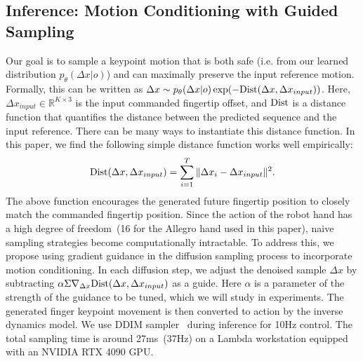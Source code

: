 \subsection{Inference: Motion Conditioning with Guided Sampling}
\label{method:inference}
Our goal is to sample a keypoint motion that is both safe (i.e. from our learned distribution $p_\theta(\Delta x|o)$) and can maximally preserve the input reference motion. Formally, this can be written as $\Delta{x}\sim p_\theta(\Delta x|o) \exp (-{\rm Dist}(\Delta x, \Delta x_{input}))$. Here, $\Delta x_{input}\in\mathbb{R}^{K\times 3}$ is the input commanded fingertip offset, and ${\rm Dist}$ is a distance function that quantifies the distance between the predicted sequence and the input reference. There can be many ways to instantiate this distance function. In this paper, we find the following simple distance function works well empirically: 
\begin{equation}
    {\rm Dist}(\Delta{x}, \Delta x_{input}) = \sum_{i=1}^T\Vert \Delta{x}_{i} - \Delta x_{input}  \Vert^2.
\end{equation}
The above function encourages the generated future fingertip position to closely match the commanded fingertip position. Since the action of the robot hand has a high degree of freedom~(16 for the Allegro hand used in this paper), naive sampling strategies become computationally intractable. To address this, we propose using gradient guidance in the diffusion sampling process to incorporate motion conditioning. In each diffusion step, we adjust the denoised sample $\Delta{x}$ by subtracting $\alpha\Sigma\nabla_{\Delta{x}} {\rm Dist}(\Delta{x}, \Delta x_{input})$ as a guide. Here $\alpha$ is a parameter of the strength of the guidance to be tuned, which we will study in experiments. The generated finger keypoint movement is then converted to action by the inverse dynamics model. We use DDIM sampler~\cite{song2020denoising} during inference for 10Hz control. The total sampling time is around 27ms~(37Hz) on a Lambda workstation equipped with an NVIDIA RTX 4090 GPU. 
